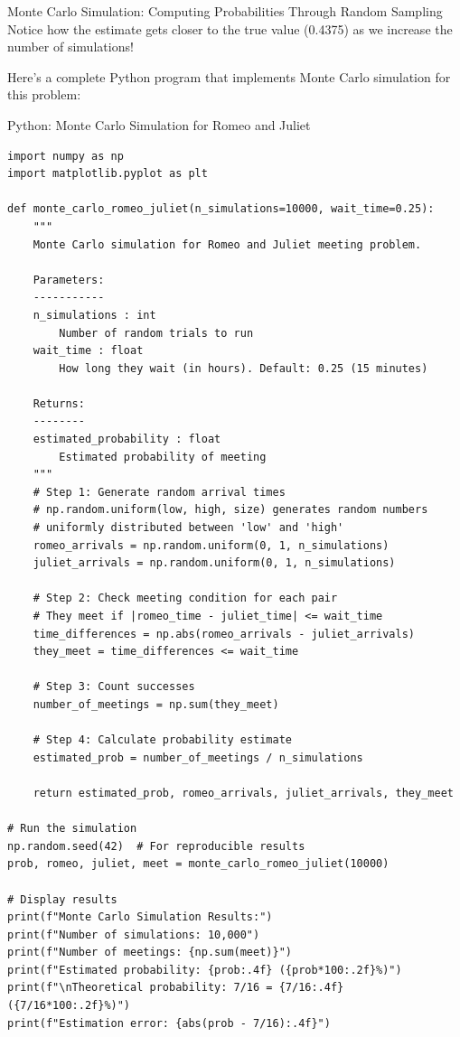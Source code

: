 \begin{itemize}
\begin{keyconceptboxbreak}{Monte Carlo Simulation: Computing Probabilities Through Random Sampling}
Notice how the estimate gets closer to the true value (0.4375) as we increase the number of simulations!


Here's a complete Python program that implements Monte Carlo simulation for this problem:

\end{keyconceptboxbreak}

\begin{codeblock}{Python: Monte Carlo Simulation for Romeo and Juliet}
\begin{lstlisting}
import numpy as np
import matplotlib.pyplot as plt

def monte_carlo_romeo_juliet(n_simulations=10000, wait_time=0.25):
    """
    Monte Carlo simulation for Romeo and Juliet meeting problem.

    Parameters:
    -----------
    n_simulations : int
        Number of random trials to run
    wait_time : float
        How long they wait (in hours). Default: 0.25 (15 minutes)

    Returns:
    --------
    estimated_probability : float
        Estimated probability of meeting
    """
    # Step 1: Generate random arrival times
    # np.random.uniform(low, high, size) generates random numbers
    # uniformly distributed between 'low' and 'high'
    romeo_arrivals = np.random.uniform(0, 1, n_simulations)
    juliet_arrivals = np.random.uniform(0, 1, n_simulations)

    # Step 2: Check meeting condition for each pair
    # They meet if |romeo_time - juliet_time| <= wait_time
    time_differences = np.abs(romeo_arrivals - juliet_arrivals)
    they_meet = time_differences <= wait_time

    # Step 3: Count successes
    number_of_meetings = np.sum(they_meet)

    # Step 4: Calculate probability estimate
    estimated_prob = number_of_meetings / n_simulations

    return estimated_prob, romeo_arrivals, juliet_arrivals, they_meet

# Run the simulation
np.random.seed(42)  # For reproducible results
prob, romeo, juliet, meet = monte_carlo_romeo_juliet(10000)

# Display results
print(f"Monte Carlo Simulation Results:")
print(f"Number of simulations: 10,000")
print(f"Number of meetings: {np.sum(meet)}")
print(f"Estimated probability: {prob:.4f} ({prob*100:.2f}%)")
print(f"\nTheoretical probability: 7/16 = {7/16:.4f} ({7/16*100:.2f}%)")
print(f"Estimation error: {abs(prob - 7/16):.4f}")


\end{lstlisting}
\end{codeblock}
\end{itemize}
